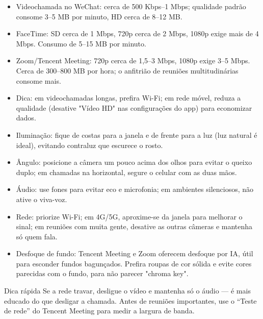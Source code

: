 
\begin{itemize}
  \item Videochamada no WeChat: cerca de 500 Kbps–1 Mbps; qualidade padrão consome 3–5 MB por minuto, HD cerca de 8–12 MB.
  \item FaceTime: SD cerca de 1 Mbps, 720p cerca de 2 Mbps, 1080p exige mais de 4 Mbps. Consumo de 5–15 MB por minuto.
  \item Zoom/Tencent Meeting: 720p cerca de 1,5–3 Mbps, 1080p exige 3–5 Mbps. Cerca de 300–800 MB por hora; o anfitrião de reuniões multitudinárias consome mais.
  \item Dica: em videochamadas longas, prefira Wi-Fi; em rede móvel, reduza a qualidade (desative "Vídeo HD" nas configurações do app) para economizar dados.
\end{itemize}


\begin{itemize}
  \item Iluminação: fique de costas para a janela e de frente para a luz (luz natural é ideal), evitando contraluz que escurece o rosto.
  \item Ângulo: posicione a câmera um pouco acima dos olhos para evitar o queixo duplo; em chamadas na horizontal, segure o celular com as duas mãos.
  \item Áudio: use fones para evitar eco e microfonia; em ambientes silenciosos, não ative o viva-voz.
  \item Rede: priorize Wi-Fi; em 4G/5G, aproxime-se da janela para melhorar o sinal; em reuniões com muita gente, desative as outras câmeras e mantenha só quem fala.
  \item Desfoque de fundo: Tencent Meeting e Zoom oferecem desfoque por IA, útil para esconder fundos bagunçados. Prefira roupas de cor sólida e evite cores parecidas com o fundo, para não parecer "chroma key".
\end{itemize}

\begin{tcbinfo}{Dica rápida}
Se a rede travar, desligue o vídeo e mantenha só o áudio — é mais educado do que desligar a chamada. Antes de reuniões importantes, use o “Teste de rede” do Tencent Meeting para medir a largura de banda.

\end{tcbinfo}

